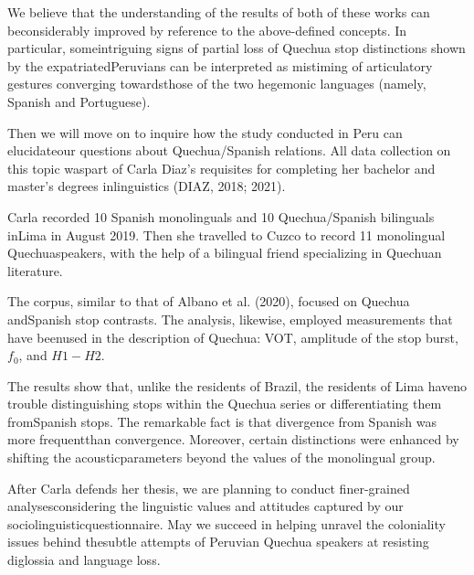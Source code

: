We believe that the understanding of the results of both of these works can
beconsiderably improved by reference to the above-defined concepts. In
particular, someintriguing signs of partial loss of Quechua stop distinctions
shown by the expatriatedPeruvians can be interpreted as mistiming of
articulatory gestures converging towardsthose of the two hegemonic languages
(namely, Spanish and Portuguese).

Then we will move on to inquire how the study conducted in Peru can
elucidateour questions about Quechua/Spanish relations. All data collection on
this topic waspart of Carla Diaz's requisites for completing her bachelor and
master’s degrees inlinguistics (DIAZ, 2018; 2021).

Carla recorded 10 Spanish monolinguals and 10 Quechua/Spanish bilinguals inLima
in August 2019. Then she travelled to Cuzco to record 11 monolingual
Quechuaspeakers, with the help of a bilingual friend specializing in Quechuan
literature.

The corpus, similar to that of Albano et al. (2020), focused on Quechua
andSpanish stop contrasts. The analysis, likewise, employed measurements that
have beenused in the description of Quechua: VOT, amplitude of the stop burst,
$f_0$, and $H1-H2$.

The results show that, unlike the residents of Brazil, the residents of Lima
haveno trouble distinguishing stops within the Quechua series or
differentiating them fromSpanish stops. The remarkable fact is that divergence
from Spanish was more frequentthan convergence. Moreover, certain distinctions
were enhanced by shifting the acousticparameters beyond the values of the
monolingual group.

After Carla defends her thesis, we are planning to conduct finer-grained
analysesconsidering the linguistic values and attitudes captured by our
sociolinguisticquestionnaire. May we succeed in helping unravel the coloniality
issues behind thesubtle attempts of Peruvian Quechua speakers at resisting
diglossia and language loss.





